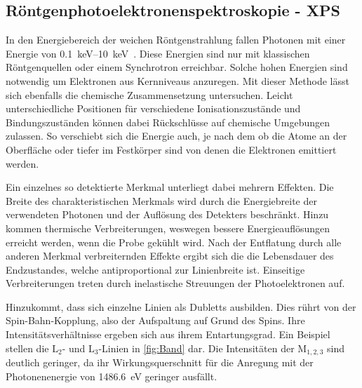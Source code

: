         \subsection{Röntgenphotoelektronenspektroskopie - XPS}
            In den Energiebereich der weichen Röntgenstrahlung fallen Photonen mit einer Energie von \SIrange{0.1}{10}{\kilo\electronvolt}~\cite{Fauster}.
            Diese Energien sind nur mit klassischen Röntgenquellen oder einem Synchrotron erreichbar.
            Solche hohen Energien sind notwendig um Elektronen aus Kernniveaus anzuregen.
            Mit dieser Methode lässt sich ebenfalls die chemische Zusammensetzung untersuchen.
            Leicht unterschiedliche Positionen für verschiedene Ionisationszustände und Bindungszuständen können dabei Rückschlüsse auf chemische Umgebungen zulassen.
            So verschiebt sich die Energie auch, je nach dem ob die Atome an der Oberfläche oder tiefer im Festkörper sind von denen die Elektronen emittiert werden.

            Ein einzelnes so detektierte Merkmal unterliegt dabei mehrern Effekten. 
            Die Breite des charakteristischen Merkmals wird durch die Energiebreite der verwendeten Photonen und der Auflösung des Detekters beschränkt.
            Hinzu kommen thermische Verbreiterungen, weswegen bessere Energieauflösungen erreicht werden, wenn die Probe gekühlt wird.
            Nach der Entflatung durch alle anderen Merkmal verbreiternden Effekte ergibt sich die die Lebensdauer des Endzustandes, welche antiproportional zur Linienbreite ist.
            Einseitige Verbreiterungen treten durch inelastische Streuungen der Photoelektronen auf.

            Hinzukommt, dass sich einzelne Linien als Dubletts ausbilden.
            Dies rührt von der Spin-Bahn-Kopplung, also der Aufspaltung auf Grund des Spins.
            Ihre Intensitätsverhältnisse ergeben sich aus ihrem Entartungsgrad. 
            Ein Beispiel stellen die $\text{L}_2$- und $\text{L}_3$-Linien in \autoref{fig:Band} dar.
            Die Intensitäten der $\text{M}_{1,2,3}$ sind deutlich geringer, da ihr Wirkungsquerschnitt für die Anregung mit der Photonenenergie von \SI{1486.6}{\electronvolt} geringer ausfällt.
        
